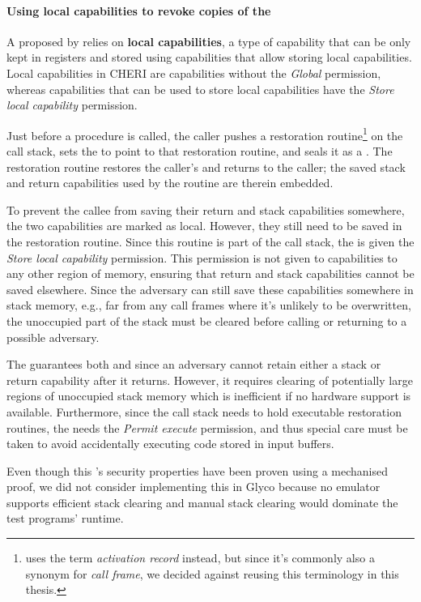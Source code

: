 \documentclass[main.tex]{subfiles}
\begin{document}
\paragraph{Using local capabilities to revoke copies of the } A  proposed by \citet{retptr} relies on \textbf{local capabilities}, a type of capability that can be only kept in registers and stored using capabilities that allow storing local capabilities. Local capabilities in CHERI are capabilities without the \emph{Global} permission, whereas capabilities that can be used to store local capabilities have the \emph{Store local capability} permission.

Just before a procedure is called, the caller pushes a restoration routine\footnote{\citet{retptr} uses the term \emph{activation record} instead, but since it's commonly also a synonym for \emph{call frame}, we decided against reusing this terminology in this thesis.} on the call stack, sets the  to point to that restoration routine, and seals it as a . The restoration routine restores the caller's  and returns to the caller; the saved stack and return capabilities used by the routine are therein embedded.

To prevent the callee from saving their return and stack capabilities somewhere, the two capabilities are marked as local. However, they still need to be saved in the restoration routine. Since this routine is part of the call stack, the  is given the \emph{Store local capability} permission. This permission is not given to capabilities to any other region of memory, ensuring that return and stack capabilities cannot be saved elsewhere. Since the adversary can still save these capabilities somewhere in stack memory, e.g., far from any call frames where it's unlikely to be overwritten, the unoccupied part of the stack must be cleared before calling or returning to a possible adversary.

The  guarantees both  and  since an adversary cannot retain either a stack or return capability after it returns. However, it requires clearing of potentially large regions of unoccupied stack memory which is inefficient if no hardware support is available. Furthermore, since the call stack needs to hold executable restoration routines, the  needs the \emph{Permit execute} permission, and thus special care must be taken to avoid accidentally executing code stored in input buffers.

Even though this 's security properties have been proven using a mechanised proof, we did not consider implementing this  in Glyco because no emulator supports efficient stack clearing and manual stack clearing would dominate the test programs' runtime.
\end{document}

